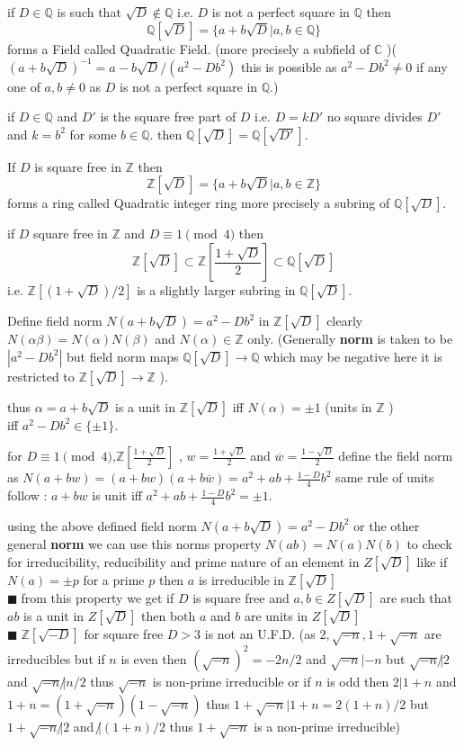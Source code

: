 \documentclass[11pt]{extarticle}
\newcommand{\ra}{\rightarrow}
\newcommand{\C}{\mathbb{C}}
\newcommand{\Z}{\mathbb{Z}}
\newcommand{\Q}{\mathbb{Q}}
\newcommand{\snote}[1]{{\footnotesize(#1)}}
\newcommand{\tbx}[2][]{
	\begin{tcolorbox}[enhanced,breakable,size=small,colback=black!2!white,title={#1},arc is angular, arc=1.5mm,drop fuzzy shadow]
		#2
	\end{tcolorbox}
}
\newcommand{\y}{$\blacksquare\;$}
\begin{document}
\begin{multicols}{2}
\tbx{if $ D \in \Q$ is such that $ \sqrt{D}\notin \Q $ i.e. $ D $ is not a perfect square in $ \Q $ then 
			\[\Q[\sqrt{D}]=\{a+b\sqrt{D}|a,b\in \Q\}\]
			forms a Field called Quadratic Field. (more precisely a subfield of $ \C $ )\snote{ $ (a+b\sqrt{D})^{-1}= a-b\sqrt{D}/(a^2-Db^2)$ this is possible as $ a^2-Db^2\neq 0 $ if any one of $ a,b\neq 0 $ as $ D $ is not a perfect square in $ \Q. $}
			} 
\tbx{if $ D \in \Q$ and $ D' $ is the square free part of $ D $ i.e.  $ D=kD' $ no square divides $ D' $ and $ k=b^2 $ for some $ b\in \Q. $ then $ \Q[\sqrt{D}] =\Q[\sqrt{D'}].$
			} 
\tbx{If $ D $ is square free in $ \Z $ then 
			\[\Z[\sqrt{D}]=\{a+b\sqrt{D}|a,b\in \Z\}\]
			forms a ring called Quadratic integer ring more precisely a subring of $ \Q[\sqrt{D}]. $ 
			} 
\tbx{if $ D $ square free in $ \Z $ and $ D\equiv 1 \pmod4 $ then 
			\[\Z[\sqrt{D}]\subset \Z[\frac{ 1+\sqrt{D} }{2}] \subset \Q[\sqrt{D}]\]
			i.e. $ \Z[(1+\sqrt{D})/2] $ is a slightly larger subring in $ \Q[\sqrt{D}] .$ 
			} 
\tbx{ Define field norm $ N(a+b\sqrt{D}) =a^2-Db^2$ in $ \Z[\sqrt{D}] $ clearly $ N(\alpha\beta)=N(\alpha)N(\beta) $ and $ N(\alpha)\in \Z $ only.
		(Generally \textbf{norm} is taken to be $ |a^2-Db^2| $ but field norm maps $ \Q[\sqrt{D}]\ra \Q $ which may be negative here it is restricted to $ \Z[\sqrt{D}]\ra \Z $ ).	} 
\tbx{thus $ \alpha=a+b\sqrt{D} $ is a unit in $ \Z[\sqrt{D}] $ iff $ N(\alpha)=\pm 1 $ (units in $ \Z $ )\\
			iff $  a^2-Db^2\in \{\pm1\}.$ 
			} 
\tbx{for $ D\equiv 1\pmod4 $,$ \Z[\frac{ 1+\sqrt{D} }{2}] $ , $ w=\frac{ 1+\sqrt{D} }{2} $ and $ \overline{w}=\frac{ 1-\sqrt{D} }{2} $ define the field norm as $ N(a+bw)=(a+bw)(a+b\overline{w})=a^2+ab+\frac{1-D}{4}b^2$ 
			same rule of units follow : $ a+bw $ is unit iff $ a^2+ab+\frac{1-D}{4}b^2=\pm 1.$ 
			} 
		\tbx{ using the above defined field norm $ N(a+b\sqrt{D}) =a^2-Db^2$ or the other general \textbf{norm} we can use this norms property $ N(ab) =N(a)N(b)$ to check for irreducibility, reducibility and prime nature of an element in $ Z[\sqrt{D}] $  like if $ N(a)=\pm p $ for a prime $ p $ then $ a $ is irreducible in $ \Z[\sqrt{D}]$\\
		\y from this property we get if $ D $ is square free and $ a,b\in Z[\sqrt{D}] $ are such that $ ab $ is a unit in $ Z[\sqrt{D}] $ then both $ a $ and $ b $ are units in $ Z[\sqrt{D}] $ \\
		\y $ \Z[\sqrt{-D}] $ for square free $ D>3 $ is not an U.F.D. \snote{as $ 2,\sqrt{-n},1+\sqrt{-n} $ are irreducibles but if $ n $ is even then $ (\sqrt{-n})^2=-2 n/2 $ and $ \sqrt{-n}|-n $ but $ \sqrt{-n}\not| 2 $ and $  \sqrt{-n}\not| n/2 $ thus $ \sqrt{-n} $ is non-prime  irreducible or if $ n $ is odd then $ 2|1+n $ and $ 1+n=(1+\sqrt{-n})(1-\sqrt{-n}) $ thus $ 1+\sqrt{-n}|1+n=2 (1+n)/2 $ but $ 1+\sqrt{-n}\not| 2 $ and $ \not| (1+n)/2 $ thus $ 1+\sqrt{-n} $ is a non-prime irreducible}
}
\end{multicols}
\end{document}
